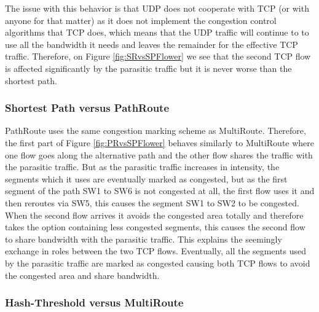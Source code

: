 The issue with this behavior is that UDP does not cooperate with TCP (or with anyone for that matter) as it does not implement the congestion control algorithms that TCP does, which means that the UDP traffic will continue to to use all the bandwidth it needs and leaves the remainder for the effective TCP traffic. Therefore, on Figure \ref{fig:SRvsSPFlower} we see that the second TCP flow is affected significantly by the parasitic traffic but it is never worse than the shortest path. 


\subsubsection{Shortest Path versus PathRoute}


PathRoute uses the same congestion marking scheme as MultiRoute. Therefore, the first part of Figure \ref{fig:PRvsSPFlower} behaves similarly to MultiRoute where one flow goes along the alternative path and the other flow shares the traffic with the parasitic traffic. But as the parasitic traffic increases in intensity, the segments which it uses are eventually marked as congested, but as the first segment of the path SW1 to SW6 is not congested at all, the first flow uses it  and then reroutes via SW5, this causes the segment SW1 to SW2  to be congested. When the second flow arrives it avoids the congested area totally and therefore takes the option containing less congested segments, this causes the second flow to share bandwidth with the parasitic traffic. This explains the seemingly exchange in roles between the two TCP flows. Eventually, all the segments used by the parasitic traffic are marked as congested causing both TCP flows to avoid the congested area and share bandwidth.

\subsubsection{Hash-Threshold versus MultiRoute}



